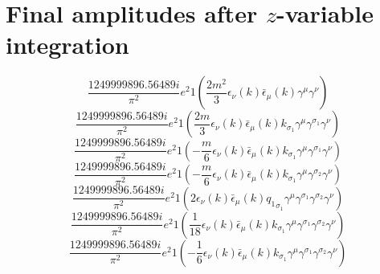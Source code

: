 \section*{Final amplitudes after $z$-variable integration}
\begin{dmath}\frac{1249999896.56489 i}{\pi^{2}} e^{2}1\left(\frac{2 m^{2}}{3} \epsilon_{ \nu }({ k }) \bar{\epsilon}_{ \mu }({ k }) { \gamma^{ \mu } } { \gamma^{ \nu } }\right)\end{dmath}
\begin{dmath}\frac{1249999896.56489 i}{\pi^{2}} e^{2}1\left(\frac{2 m}{3} \epsilon_{ \nu }({ k }) \bar{\epsilon}_{ \mu }({ k }) { { k }_{ \sigma_1 } } { \gamma^{ \mu } } { \gamma^{ \sigma_1 } } { \gamma^{ \nu } }\right)\end{dmath}
\begin{dmath}\frac{1249999896.56489 i}{\pi^{2}} e^{2}1\left(- \frac{m}{6} \epsilon_{ \nu }({ k }) \bar{\epsilon}_{ \mu }({ k }) { { k }_{ \sigma_1 } } { \gamma^{ \mu } } { \gamma^{ \sigma_1 } } { \gamma^{ \nu } }\right)\end{dmath}
\begin{dmath}\frac{1249999896.56489 i}{\pi^{2}} e^{2}1\left(- \frac{m}{6} \epsilon_{ \nu }({ k }) \bar{\epsilon}_{ \mu }({ k }) { { k }_{ \sigma_1 } } { \gamma^{ \mu } } { \gamma^{ \sigma_2 } } { \gamma^{ \nu } }\right)\end{dmath}
\begin{dmath}\frac{1249999896.56489 i}{\pi^{2}} e^{2}1\left(2 \epsilon_{ \nu }({ k }) \bar{\epsilon}_{ \mu }({ k }) { { q_1 }_{ \sigma_1 } } { \gamma^{ \mu } } { \gamma^{ \sigma_1 } } { \gamma^{ \sigma_2 } } { \gamma^{ \nu } }\right)\end{dmath}
\begin{dmath}\frac{1249999896.56489 i}{\pi^{2}} e^{2}1\left(\frac{1}{18} \epsilon_{ \nu }({ k }) \bar{\epsilon}_{ \mu }({ k }) { { k }_{ \sigma_1 } } { \gamma^{ \mu } } { \gamma^{ \sigma_1 } } { \gamma^{ \sigma_2 } } { \gamma^{ \nu } }\right)\end{dmath}
\begin{dmath}\frac{1249999896.56489 i}{\pi^{2}} e^{2}1\left(- \frac{1}{6} \epsilon_{ \nu }({ k }) \bar{\epsilon}_{ \mu }({ k }) { { k }_{ \sigma_1 } } { \gamma^{ \mu } } { \gamma^{ \sigma_1 } } { \gamma^{ \sigma_2 } } { \gamma^{ \nu } }\right)\end{dmath}
